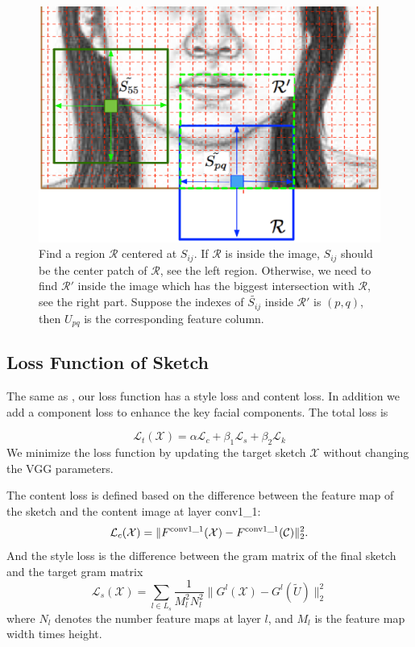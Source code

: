 \documentclass[10pt,twocolumn,letterpaper]{article}
\begin{document}
\begin{figure}[htbp]
\centering
\includegraphics[width=0.99\linewidth]{img/border_PFC.eps}
\caption{Find a region $\mathcal{R}$ centered at $S_{ij}$. If $\mathcal{R}$ is inside the image, $S_{ij}$ should be the center patch of $\mathcal{R}$, see the left region. Otherwise, we need to find $\mathcal{R}'$ inside the image which has the biggest intersection with $\mathcal{R}$, see the right part. Suppose the indexes of $\tilde{S_{ij}}$ inside $\mathcal{R}'$ is $(p, q)$, then $U_{pq}$ is the corresponding feature column.}
\label{fig:border_example}
\end{figure}

\subsection{Loss Function of Sketch}

The same as \cite{gatys2015neural}, our loss function has a style loss and content loss. In addition we add a component loss to enhance the key facial components. The total loss is

\begin{equation}
\mathcal{L}_{t}( \mathcal{X} ) = \alpha \mathcal{L}_{c} + \beta_1 \mathcal{L}_{s} + \beta_2 \mathcal{L}_{k}
\label{eq:Total_loss}
\end{equation}
We minimize the loss function by updating the target sketch $\mathcal{X}$ without changing the VGG parameters.

The content loss is defined based on the difference between the feature map of the sketch and the content image at layer conv1\_1:
\begin{equation}
\mathcal{L}_{c}( \mathcal{X} ) = \| {{F^{\rm{conv1\_1}}}( \mathcal{X} ) - {F^{\rm{conv1\_1}}}( \mathcal{C} )} \|_2^2.
\label{eq:content_loss}
\end{equation}
And the style loss is the difference between the gram matrix of the final sketch and the target gram matrix 
\begin{equation}
\mathcal{L}_{s} ( \mathcal{X} ) = \sum\limits_{l \in {L_s}} {\frac{1}{{M_l^2N_l^2}}\| {{G^l}( \mathcal{X} ) - G^l(\tilde{U})} \|_2^2} 
\label{eq:Gram_loss}
\end{equation}
where $N_l$ denotes the number feature maps at layer $l$, and $M_l$ is the feature map width times height.  
\end{document}
